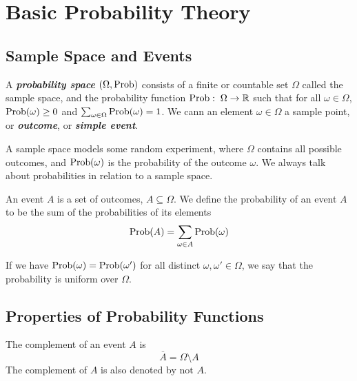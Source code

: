 \section{Basic Probability Theory}

\subsection{Sample Space and Events}

\vspace{\parskip}

\begin{definition}    
    A \textit{\textbf{probability space}} $(\Omega, \mathrm{Prob})$ consists of a finite or countable set $\Omega$ called the sample space, and the probability function $\mathrm{Prob}:\; \Omega \to \mathbb{R}$ such that for all $\omega \in \Omega$, $\mathrm{Prob}(\omega) \geq 0$ and $\sum_{\omega \in \Omega} \mathrm{Prob}(\omega) = 1$. We cann an element $\omega \in \Omega$ a sample point, or \textit{\textbf{outcome}}, or \textit{\textbf{simple event}}.
\end{definition}

A sample space models some random experiment, where $\Omega$ contains all possible outcomes, and $\mathrm{Prob}(\omega)$ is the probability of the outcome $\omega$. We always talk about probabilities in relation to a sample space.

\begin{definition}[Event]
    An event $A$ is a set of outcomes, $A \subseteq \Omega$. We define the probability of an event $A$ to be the sum of the probabilities of its elements
    $$
    \mathrm{Prob}(A) = \sum_{\omega \in A} \mathrm{Prob}(\omega)
    $$ 
\end{definition}

If we have $\mathrm{Prob}(\omega) = \mathrm{Prob}(\omega')$ for all distinct $\omega, \omega' \in \Omega$, we say that the probability is uniform over $\Omega$.

\subsection{Properties of Probability Functions}

\vspace{\parskip}

\begin{definition}[Complement]
    The complement of an event $A$ is
    $$
    \overline{A} = \Omega \setminus A
    $$
    The complement of $A$ is also denoted by $\text{not }A$. 
\end{definition}

